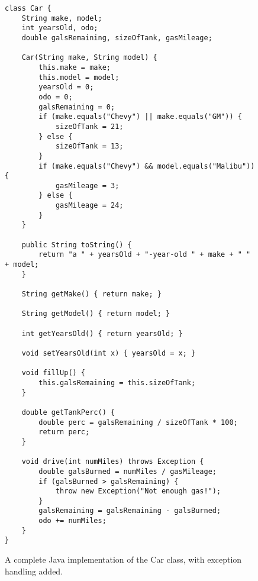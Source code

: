 
\begin{figure}
\begin{Verbatim}[fontsize=\scriptsize,frame=single]
class Car {
    String make, model;
    int yearsOld, odo;
    double galsRemaining, sizeOfTank, gasMileage;

    Car(String make, String model) {
        this.make = make;
        this.model = model;
        yearsOld = 0;
        odo = 0;
        galsRemaining = 0;
        if (make.equals("Chevy") || make.equals("GM")) {
            sizeOfTank = 21;
        } else {
            sizeOfTank = 13;
        }
        if (make.equals("Chevy") && model.equals("Malibu")) {
            gasMileage = 3;
        } else {
            gasMileage = 24;
        }
    }

    public String toString() {
        return "a " + yearsOld + "-year-old " + make + " " + model;
    }

    String getMake() { return make; }

    String getModel() { return model; }

    int getYearsOld() { return yearsOld; }

    void setYearsOld(int x) { yearsOld = x; }

    void fillUp() {
        this.galsRemaining = this.sizeOfTank;
    }

    double getTankPerc() {
        double perc = galsRemaining / sizeOfTank * 100;
        return perc;
    }

    void drive(int numMiles) throws Exception {
        double galsBurned = numMiles / gasMileage;
        if (galsBurned > galsRemaining) {
            throw new Exception("Not enough gas!");
        }
        galsRemaining = galsRemaining - galsBurned;
        odo += numMiles;
    }
}
\end{Verbatim}
\caption{A complete Java implementation of the Car class, with exception
handling added.}
\label{fig:carClassCode}
\end{figure}

